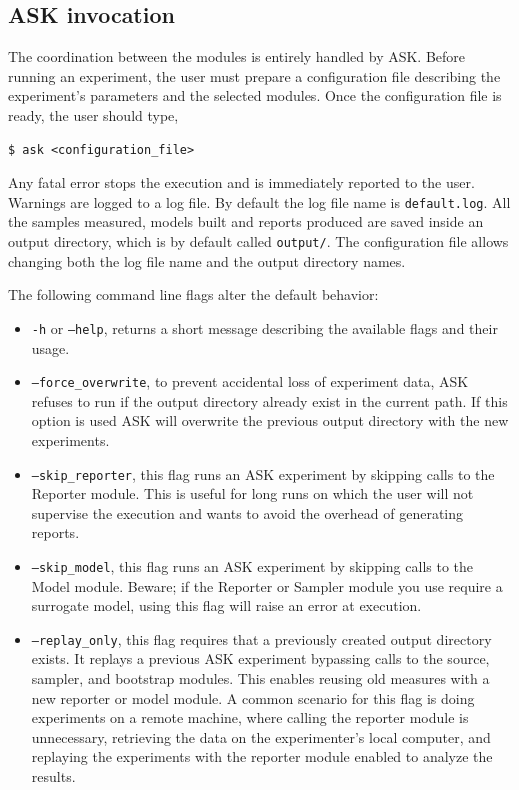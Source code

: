 \subsection{ASK invocation}

The coordination between the modules is entirely handled by ASK. 
Before running an experiment, the user must prepare a configuration file describing the experiment's parameters and the selected modules.
Once the configuration file is ready, the user should type,

\begin{verbatim}
$ ask <configuration_file>
\end{verbatim}

Any fatal error stops the execution and is immediately reported to the user. Warnings are logged to a log file. By default the log file name is \texttt{default.log}. All the samples measured, models built and reports produced are saved inside an output directory, which is by default called \texttt{output/}. The configuration file allows changing both the log file name and the output directory names.

The following command line flags alter the default behavior:

\begin{itemize}
	\item \texttt{-h} or \texttt{--help}, returns a short message describing the available flags and their usage.
	\item \texttt{--force\_overwrite}, to prevent accidental loss of experiment data, ASK refuses to run if the output directory already exist in the current path. If this option is used ASK will overwrite the previous output directory with the new experiments.
	\item \texttt{--skip\_reporter}, this flag runs an ASK experiment by skipping calls to the Reporter module. This is useful for long runs on which the user will not supervise the execution and wants to avoid the overhead of generating reports.
	\item \texttt{--skip\_model}, this flag runs an ASK experiment by skipping calls to the Model module. Beware; if the Reporter or Sampler module you use require a surrogate model, using this flag will raise an error at execution.
	\item \texttt{--replay\_only}, this flag requires that a previously created output directory exists. It replays a previous ASK experiment bypassing calls to the source, sampler, and bootstrap modules. This enables reusing old measures with a new reporter or model module. A common scenario for this flag is doing experiments on a remote machine, where calling the reporter module is unnecessary, retrieving the data on the experimenter's local computer, and replaying the experiments with the reporter module enabled to analyze the results.
\end{itemize}

